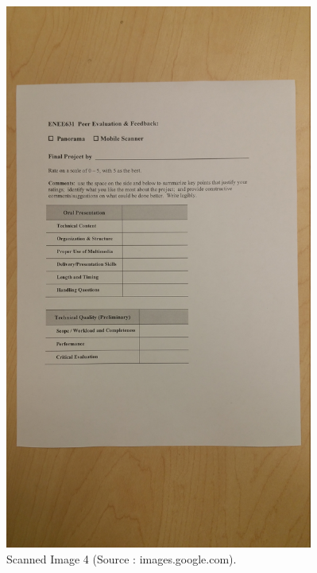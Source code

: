 \begin{figure}[th]
	\centering
	\includegraphics[height=18cm ]{Figures/test_reference_image}
	\caption[Scanned Image 4]{Scanned Image 4 (Source : images.google.com).}
	\label{fig:ScannedImage4}
\end{figure}

\pagebreak


